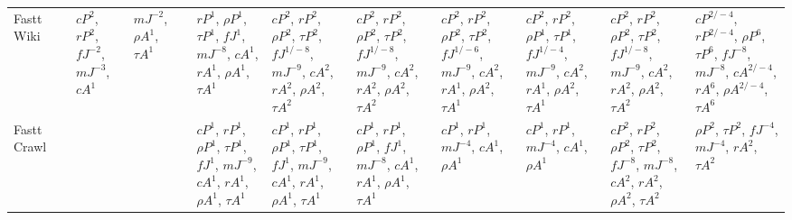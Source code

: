 \documentclass[letterpaper]{article} %
\begin{document}
\begin{sidewaystable*}
\begin{tabular}{l l l l l l l l l l l l}
\multirow{9}{1.5cm}{Fastt Wiki} & \multirow{9}{1.5cm}{} & \multirow{9}{1.5cm}{$cP^{2}$, $r P^{2}$, $fJ^{-2}$, $mJ^{-3}$, $cA^{1}$} & \multirow{9}{1.5cm}{$mJ^{-2}$, $\rho A^{1}$, $\tau A^{1}$} & \multirow{9}{1.5cm}{} & \multirow{9}{1.5cm}{$r P^{1}$, $\rho P^{1}$, $\tau P^{1}$, $fJ^{1}$, $mJ^{-8}$, $cA^{1}$, $r A^{1}$, $\rho A^{1}$, $\tau A^{1}$} & \multirow{9}{1.5cm}{$cP^{2}$, $r P^{2}$, $\rho P^{2}$, $\tau P^{2}$, $fJ^{1/-8}$, $mJ^{-9}$, $cA^{2}$, $r A^{2}$, $\rho A^{2}$, $\tau A^{2}$} & \multirow{9}{1.5cm}{$cP^{2}$, $r P^{2}$, $\rho P^{2}$, $\tau P^{2}$, $fJ^{1/-8}$, $mJ^{-9}$, $cA^{2}$, $r A^{2}$, $\rho A^{2}$, $\tau A^{2}$} & \multirow{9}{1.5cm}{$cP^{2}$, $r P^{2}$, $\rho P^{2}$, $\tau P^{2}$, $fJ^{1/-6}$, $mJ^{-9}$, $cA^{2}$, $r A^{1}$, $\rho A^{2}$, $\tau A^{1}$} & \multirow{9}{1.5cm}{$cP^{2}$, $r P^{2}$, $\rho P^{1}$, $\tau P^{1}$, $fJ^{1/-4}$, $mJ^{-9}$, $cA^{2}$, $r A^{1}$, $\rho A^{2}$, $\tau A^{1}$} & \multirow{9}{1.5cm}{$cP^{2}$, $r P^{2}$, $\rho P^{2}$, $\tau P^{2}$, $fJ^{1/-8}$, $mJ^{-9}$, $cA^{2}$, $r A^{2}$, $\rho A^{2}$, $\tau A^{2}$} & \multirow{9}{1.5cm}{$cP^{2/-4}$, $r P^{2/-4}$, $\rho P^{6}$, $\tau P^{6}$, $fJ^{-8}$, $mJ^{-8}$, $cA^{2/-4}$, $r A^{6}$, $\rho A^{2/-4}$, $\tau A^{6}$} \\ \\ \\ \\ \\ \\ \\ \\ \\
\midrule
\multirow{6}{1.5cm}{Fastt Crawl} & \multirow{6}{1.5cm}{} & \multirow{6}{1.5cm}{} & \multirow{6}{1.5cm}{} & \multirow{6}{1.5cm}{} & \multirow{6}{1.5cm}{$cP^{1}$, $r P^{1}$, $\rho P^{1}$, $\tau P^{1}$, $fJ^{1}$, $mJ^{-9}$, $cA^{1}$, $r A^{1}$, $\rho A^{1}$, $\tau A^{1}$} & \multirow{6}{1.5cm}{$cP^{1}$, $r P^{1}$, $\rho P^{1}$, $\tau P^{1}$, $fJ^{1}$, $mJ^{-9}$, $cA^{1}$, $r A^{1}$, $\rho A^{1}$, $\tau A^{1}$} & \multirow{6}{1.5cm}{$cP^{1}$, $r P^{1}$, $\rho P^{1}$, $fJ^{1}$, $mJ^{-8}$, $cA^{1}$, $r A^{1}$, $\rho A^{1}$, $\tau A^{1}$} & \multirow{6}{1.5cm}{$cP^{1}$, $r P^{1}$, $mJ^{-4}$, $cA^{1}$, $\rho A^{1}$} & \multirow{6}{1.5cm}{$cP^{1}$, $r P^{1}$, $mJ^{-4}$, $cA^{1}$, $\rho A^{1}$} & \multirow{6}{1.5cm}{$cP^{2}$, $r P^{2}$, $\rho P^{2}$, $\tau P^{2}$, $fJ^{-8}$, $mJ^{-8}$, $cA^{2}$, $r A^{2}$, $\rho A^{2}$, $\tau A^{2}$} & \multirow{6}{1.5cm}{$\rho P^{2}$, $\tau P^{2}$, $fJ^{-4}$, $mJ^{-4}$, $r A^{2}$, $\tau A^{2}$} \\ \\ \\ \\ \\ \\

\end{tabular}
\end{sidewaystable*}
\end{document}

